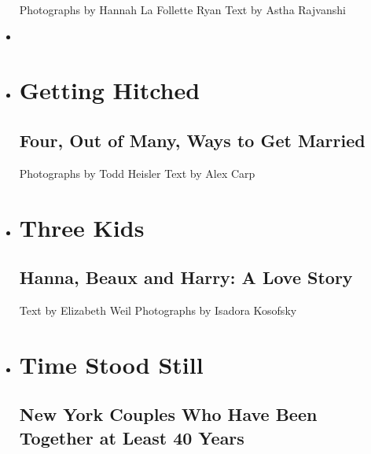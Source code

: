 \begin{itemize}
   Photographs by Hannah La Follette Ryan Text by Astha Rajvanshi 
\item
\item
  \href{https://www.nytimes3xbfgragh.onion/interactive/2018/06/07/magazine/new-york-love-four-weddings.html}{}

  \hypertarget{getting-hitched}{%
  \section{Getting Hitched}\label{getting-hitched}}

  \hypertarget{four-out-of-many-ways-to-get-married}{%
  \subsection{Four, Out of Many, Ways to Get
  Married}\label{four-out-of-many-ways-to-get-married}}

   Photographs by Todd Heisler Text by Alex Carp 
\item
  \href{https://www.nytimes3xbfgragh.onion/interactive/2018/06/07/magazine/new-york-love-three-kids.html}{}

  \hypertarget{three-kids}{%
  \section{Three Kids}\label{three-kids}}

  \hypertarget{hanna-beaux-and-harry-a-love-story}{%
  \subsection{Hanna, Beaux and Harry: A Love
  Story}\label{hanna-beaux-and-harry-a-love-story}}

   Text by Elizabeth Weil Photographs by Isadora Kosofsky 
\item
  \href{https://www.nytimes3xbfgragh.onion/interactive/2018/06/07/magazine/new-york-love-couples-40-years-together.html}{}

  \hypertarget{time-stood-still}{%
  \section{\texorpdfstring{\textbf{Time Stood
  Still}}{Time Stood Still}}\label{time-stood-still}}

  \hypertarget{new-york-couples-who-have-been-together-at-least-40-years}{%
  \subsection{New York Couples Who Have Been Together at Least 40
  Years}\label{new-york-couples-who-have-been-together-at-least-40-years}}


\end{itemize}
